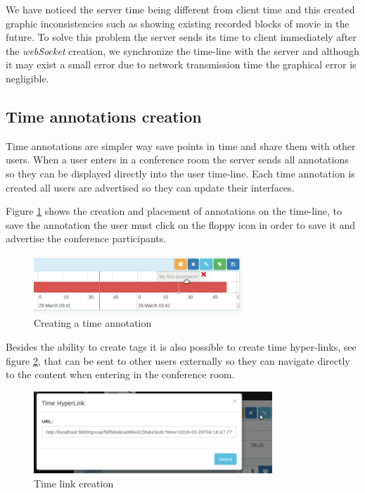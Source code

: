 	We have noticed the server time being different from client time and this created graphic inconsistencies such as showing existing recorded blocks of movie in the future. To solve this problem the server sends its time to client immediately after the \emph{webSocket} creation, we synchronize the time-line with the server and although it may exist a small error due to network transmission time the graphical error is negligible. 


	\subsection{Time annotations creation}

	Time annotations are simpler way save points in time and share them with other users. When a user enters in a conference room the server sends all annotations so they can be displayed directly into the user time-line. Each time annotation is created all users are advertised so they can update their interfaces.

	Figure \ref{fig:annotation} shows the creation and placement of annotations on the time-line, to save the annotation the user must click on the floppy icon in order to save it and advertise the conference participants. 

	\begin{figure}[!htb]
		\centering
		\includegraphics[width=0.7\textwidth]{figures/annotation.png}
		\caption{Creating a time annotation}
		\label{fig:annotation}
	\end{figure}

	Besides the ability to create tags it is also possible to create time hyper-links, see figure \ref{fig:timelink}, that can be sent to other users externally so they can navigate directly to the content when entering in the conference room.


	\begin{figure}[!htb]
		\centering
		\includegraphics[width=0.8\textwidth]{figures/timelink.png}
		\caption{Time link creation}
		\label{fig:timelink}
	\end{figure}


